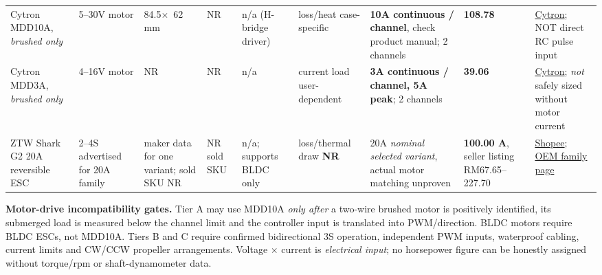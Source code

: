 \begin{landscape}
\begin{longtable}{L{25mm}L{21mm}L{22mm}L{23mm}L{30mm}L{36mm}L{31mm}L{23mm}L{32mm}}
Cytron MDD10A, \emph{brushed only} \cite{mdd10} & 5--30V motor & \mbox{84.5$\times$ 62\,mm} \cite{mdd10} & NR & n/a (H-bridge driver) & loss/heat case-specific & \textbf{10A continuous / channel}, check product manual; 2 channels & \textbf{108.78} & \href{https://my.cytron.io/c-motor-driver/c-dc-motor-driver/p-10amp-5v-30v-dc-motor-driver-2-channels}{Cytron}; NOT direct RC pulse input \\
Cytron MDD3A, \emph{brushed only} \cite{mdd3} & 4--16V motor & NR & NR & n/a & current load user-dependent & \textbf{3A continuous / channel, 5A peak}; 2 channels & \textbf{39.06} & \href{https://my.cytron.io/c-motor-driver/c-dc-motor-driver/p-3amp-4v-16v-dc-motor-driver-2-channels}{Cytron}; \emph{not} safely sized without motor current \\
ZTW Shark G2 20A reversible ESC \cite{ztwShop,ztwDoc} & 2--4S advertised for 20A family & maker data for one variant; sold SKU NR & NR sold SKU & n/a; supports BLDC only & loss/thermal draw \textbf{NR} & 20A \emph{nominal selected variant}, actual motor matching unproven & \textbf{100.00 A}, seller listing RM67.65--227.70 & \href{https://shopee.com.my/ZTW-Shark-G2-20A-30A-40A-50A-60A-80A-100A-2-4S-2-6S-32-bit-Water-cooling-Dual-way-Waterproof-Brushless-ESC-For-RC-Boat-underwater-Thruster-i.53025383.19459335204}{Shopee}; \href{https://www.ztwoem.com/products/info.html?id=157}{OEM family page} \\
\end{longtable}
\end{landscape}
\textbf{Motor-drive incompatibility gates.} Tier A may use MDD10A \emph{only after} a two-wire brushed motor is positively identified, its submerged load is measured below the channel limit and the controller input is translated into PWM/direction. BLDC motors require BLDC ESCs, not MDD10A. Tiers B and C require confirmed bidirectional 3S operation, independent PWM inputs, waterproof cabling, current limits and CW/CCW propeller arrangements. Voltage $\times$ current is \emph{electrical input}; no horsepower figure can be honestly assigned without torque/rpm or shaft-dynamometer data.

